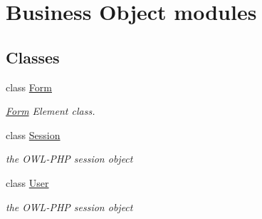 \section{Business Object modules}
\label{group__OWL__BO__LAYER}
\subsection*{Classes}
\begin{DoxyCompactItemize}
\item 
class \hyperlink{classForm}{Form}
\begin{DoxyCompactList}\small\item\em \hyperlink{classForm}{Form} Element class. \item\end{DoxyCompactList}\item 
class \hyperlink{classSession}{Session}
\begin{DoxyCompactList}\small\item\em the OWL-\/PHP session object \item\end{DoxyCompactList}\item 
class \hyperlink{classUser}{User}
\begin{DoxyCompactList}\small\item\em the OWL-\/PHP session object \item\end{DoxyCompactList}\end{DoxyCompactItemize}
